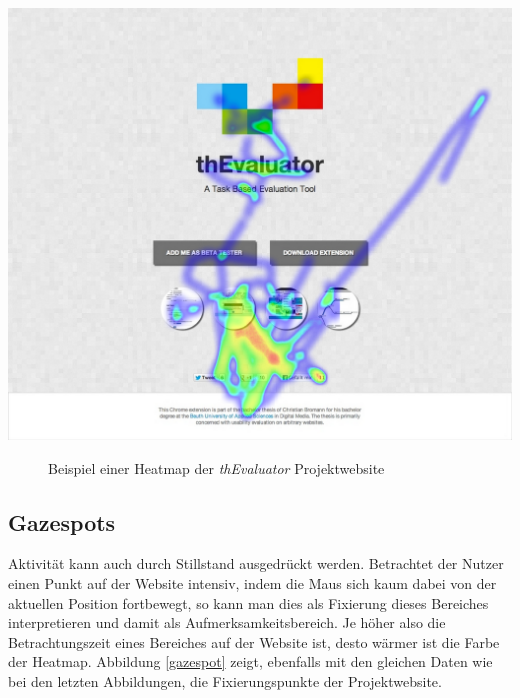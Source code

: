 \vspace{0.3cm}
\begin{center}
\includegraphics[scale=0.35]{./images/heatmap}
\end{center}
\begin{figure}[htb]
   \centering
   \caption{Beispiel einer Heatmap der \textit{thEvaluator} Projektwebsite}
    \label{heatmap}
\end{figure}


\subsection{Gazespots}

Aktivität kann auch durch Stillstand ausgedrückt werden. Betrachtet der Nutzer einen Punkt auf der Website intensiv, indem die Maus sich kaum dabei von der aktuellen Position fortbewegt, so kann man dies als Fixierung dieses Bereiches interpretieren und damit als Aufmerksamkeitsbereich. Je höher also die Betrachtungszeit eines Bereiches auf der Website ist, desto wärmer ist die Farbe der Heatmap. Abbildung \ref{gazespot} zeigt, ebenfalls mit den gleichen Daten wie bei den letzten Abbildungen, die Fixierungspunkte der Projektwebsite.


